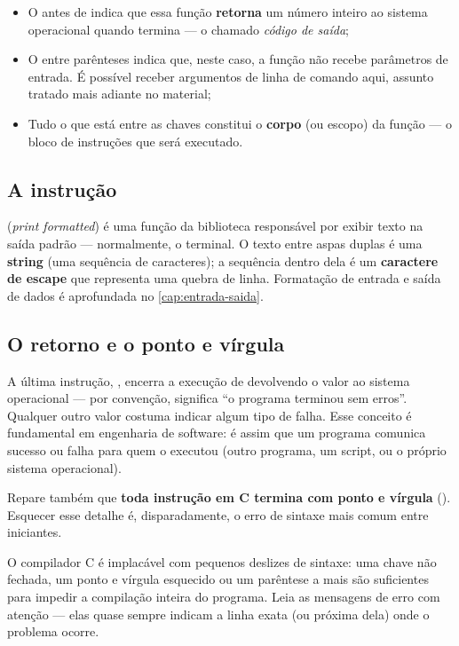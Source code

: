 \begin{itemize}
    \item O  antes de  indica que essa função \textbf{retorna} um número inteiro ao sistema operacional quando termina — o chamado \emph{código de saída};
    \item O  entre parênteses indica que, neste caso, a função não recebe parâmetros de entrada. É possível receber argumentos de linha de comando aqui, assunto tratado mais adiante no material;
    \item Tudo o que está entre as chaves \code{\{ \}} constitui o \textbf{corpo} (ou escopo) da função — o bloco de instruções que será executado.
\end{itemize}

\subsection{A instrução }

 (\emph{print formatted}) é uma função da biblioteca  responsável por exibir texto na saída padrão — normalmente, o terminal. O texto entre aspas duplas é uma \textbf{string} (uma sequência de caracteres); a sequência  dentro dela é um \textbf{caractere de escape} que representa uma quebra de linha. Formatação de entrada e saída de dados é aprofundada no \cref{cap:entrada-saida}.

\subsection{O retorno e o ponto e vírgula}

A última instrução, , encerra a execução de  devolvendo o valor  ao sistema operacional — por convenção,  significa ``o programa terminou sem erros''. Qualquer outro valor costuma indicar algum tipo de falha. Esse conceito é fundamental em engenharia de software: é assim que um programa comunica sucesso ou falha para quem o executou (outro programa, um script, ou o próprio sistema operacional).

Repare também que \textbf{toda instrução em C termina com ponto e vírgula} (\code{;}). Esquecer esse detalhe é, disparadamente, o erro de sintaxe mais comum entre iniciantes.

\begin{atencao}
O compilador C é implacável com pequenos deslizes de sintaxe: uma chave não fechada, um ponto e vírgula esquecido ou um parêntese a mais são suficientes para impedir a compilação inteira do programa. Leia as mensagens de erro com atenção — elas quase sempre indicam a linha exata (ou próxima dela) onde o problema ocorre.
\end{atencao}

